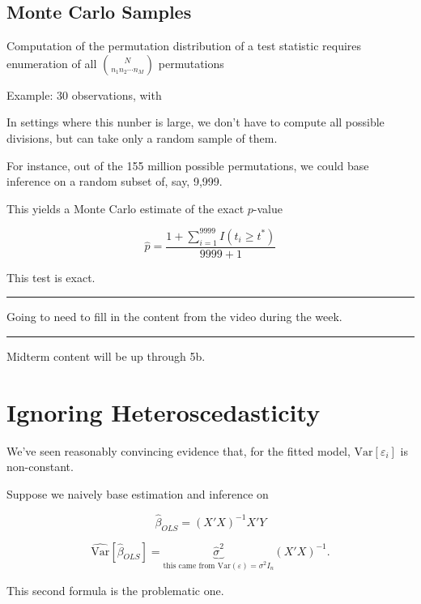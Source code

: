 \documentclass[
  letterpaper,
  DIV=11,
  numbers=noendperiod]{scrreport}
\begin{document}
\hypertarget{monte-carlo-samples}{%
\subsection{Monte Carlo Samples}\label{monte-carlo-samples}}

Computation of the permutation distribution of a test statistic requires
enumeration of all \({ N \choose n_1 n_2 \cdots n_M }\) permutations

Example: 30 observations, with

In settings where this nunber is large, we don't have to compute all
possible divisions, but can take only a random sample of them.

For instance, out of the 155 million possible permutations, we could
base inference on a random subset of, say, 9,999.

This yields a {Monte Carlo estimate} of the exact \(p\)-value

\[\hat p = \frac{1 + \sum_{i=1}^{9999} I(t_i \geq t^*)}{9999 + 1}
\]

This test is exact.

\begin{center}\rule{0.5\linewidth}{0.5pt}\end{center}

Going to need to fill in the content from the video during the week.

\begin{center}\rule{0.5\linewidth}{0.5pt}\end{center}

Midterm content will be up through 5b.

\hypertarget{ignoring-heteroscedasticity}{%
\section{Ignoring
Heteroscedasticity}\label{ignoring-heteroscedasticity}}

We've seen reasonably convincing evidence that, for the fitted model,
\(\text{Var}[\varepsilon_i]\) is non-constant.

Suppose we naively base estimation and inference on

\[\hat \beta_{OLS} = (X'X)^{-1}X'Y
\]

\[\widehat{\text{Var}}[\hat \beta_{OLS}] = \underbrace{\hat \sigma^2}_{\text{this came from }\text{Var}(\varepsilon) = \sigma^2 I_n}(X'X)^{-1}.
\]

This second formula is the problematic one.
\end{document}
